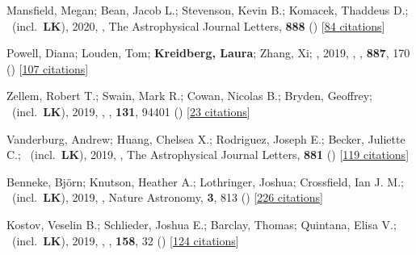 \item[{\color{numcolor}\scriptsize33}] Mansfield, Megan; Bean, Jacob L.; Stevenson, Kevin B.; Komacek, Thaddeus D.; \etal\ (incl.\ \textbf{LK}), 2020, , The Astrophysical Journal Letters, \textbf{888} () [\href{https://ui.adsabs.harvard.edu/abs/2020ApJ...888L..15M}{84 citations}]

\item[{\color{numcolor}\scriptsize32}] Powell, Diana; Louden, Tom; \textbf{Kreidberg, Laura}; Zhang, Xi; \etal, 2019, , \apj, \textbf{887}, 170 () [\href{https://ui.adsabs.harvard.edu/abs/2019ApJ...887..170P}{107 citations}]

\item[{\color{numcolor}\scriptsize31}] Zellem, Robert T.; Swain, Mark R.; Cowan, Nicolas B.; Bryden, Geoffrey; \etal\ (incl.\ \textbf{LK}), 2019, , \pasp, \textbf{131}, 94401 () [\href{https://ui.adsabs.harvard.edu/abs/2019PASP..131i4401Z}{23 citations}]

\item[{\color{numcolor}\scriptsize30}] Vanderburg, Andrew; Huang, Chelsea X.; Rodriguez, Joseph E.; Becker, Juliette C.; \etal\ (incl.\ \textbf{LK}), 2019, , The Astrophysical Journal Letters, \textbf{881} () [\href{https://ui.adsabs.harvard.edu/abs/2019ApJ...881L..19V}{119 citations}]

\item[{\color{numcolor}\scriptsize29}] Benneke, Bj{\"o}rn; Knutson, Heather A.; Lothringer, Joshua; Crossfield, Ian J. M.; \etal\ (incl.\ \textbf{LK}), 2019, , Nature Astronomy, \textbf{3}, 813 () [\href{https://ui.adsabs.harvard.edu/abs/2019NatAs...3..813B}{226 citations}]

\item[{\color{numcolor}\scriptsize28}] Kostov, Veselin B.; Schlieder, Joshua E.; Barclay, Thomas; Quintana, Elisa V.; \etal\ (incl.\ \textbf{LK}), 2019, , \aj, \textbf{158}, 32 () [\href{https://ui.adsabs.harvard.edu/abs/2019AJ....158...32K}{124 citations}]

